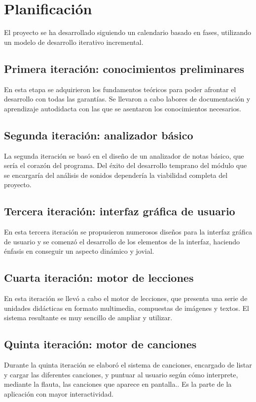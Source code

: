 \documentclass[a4paper,11pt]{article}
\begin{document}
\section{Planificación}
El proyecto se ha desarrollado siguiendo un calendario basado en fases,
utilizando un modelo de desarrollo iterativo incremental.

\subsection{Primera iteración: conocimientos preliminares}
En esta etapa se adquirieron los fundamentos teóricos para poder afrontar el
desarrollo con todas las garantías. Se llevaron a cabo labores de documentación
y aprendizaje autodidacta con las que se asentaron los conocimientos necesarios.

\subsection{Segunda iteración: analizador básico}
La segunda iteración se basó en el diseño de un analizador de notas básico, que
sería el corazón del programa. Del éxito del desarrollo temprano del módulo que
se encargaría del análisis de sonidos dependería la viabilidad completa del
proyecto.

\subsection{Tercera iteración: interfaz gráfica de usuario}
En esta tercera iteración se propusieron numerosos diseños para la interfaz
gráfica de usuario y se comenzó el desarrollo de los elementos de la interfaz,
haciendo énfasis en conseguir un aspecto dinámico y jovial.

\subsection{Cuarta iteración: motor de lecciones}
En esta iteración se llevó a cabo el motor de lecciones, que presenta una serie
de unidades didácticas en formato multimedia, compuestas de imágenes y
textos. El sistema resultante es muy sencillo de ampliar y utilizar.

\subsection{Quinta iteración: motor de canciones}
Durante la quinta iteración se elaboró el sistema de canciones, encargado de
listar y cargar las diferentes canciones, y puntuar al usuario según cómo
interprete, mediante la flauta, las canciones que aparece en pantalla.. Es la
parte de la aplicación con mayor interactividad.
\end{document}
